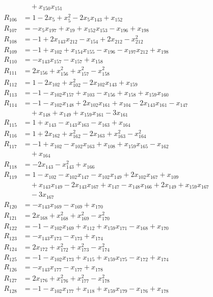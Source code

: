 \begin{align*}
&\quad{}+x_{150}x_{151}\\
R_{106}&=1-2x_{5}+x_{5}^{2}-2x_{5}x_{143}+x_{152}\\
R_{107}&=-x_{5}x_{197}+x_{19}+x_{152}x_{153}-x_{196}+x_{198}\\
R_{108}&=-1+2x_{143}x_{212}-x_{154}+2x_{212}-x_{212}^{2}\\
R_{109}&=-1+x_{102}+x_{154}x_{155}-x_{196}-x_{197}x_{212}+x_{198}\\
R_{110}&=-x_{143}x_{157}-x_{157}+x_{158}\\
R_{111}&=2x_{156}+x_{156}^{2}+x_{157}^{2}-x_{158}^{2}\\
R_{112}&=1-2x_{102}+x_{102}^{2}-2x_{102}x_{143}+x_{159}\\
R_{113}&=-1-x_{102}x_{157}+x_{103}-x_{156}+x_{158}+x_{159}x_{160}\\
R_{114}&=-1-x_{102}x_{148}+2x_{102}x_{161}+x_{104}-2x_{143}x_{161}-x_{147}\\
&\quad{}+x_{148}+x_{149}+x_{159}x_{161}-3x_{161}\\
R_{115}&=1+x_{143}-x_{143}x_{163}-x_{163}+x_{164}\\
R_{116}&=1+2x_{162}+x_{162}^{2}-2x_{163}+x_{163}^{2}-x_{164}^{2}\\
R_{117}&=-1+x_{102}-x_{102}x_{163}+x_{108}+x_{159}x_{165}-x_{162}\\
&\quad{}+x_{164}\\
R_{118}&=-2x_{143}-x_{143}^{2}+x_{166}\\
R_{119}&=1-x_{102}-x_{102}x_{147}-x_{102}x_{149}+2x_{102}x_{167}+x_{109}\\
&\quad{}+x_{143}x_{149}-2x_{143}x_{167}+x_{147}-x_{148}x_{166}+2x_{149}+x_{159}x_{167}\\
&\quad{}-3x_{167}\\
R_{120}&=-x_{143}x_{169}-x_{169}+x_{170}\\
R_{121}&=2x_{168}+x_{168}^{2}+x_{169}^{2}-x_{170}^{2}\\
R_{122}&=-1-x_{102}x_{169}+x_{112}+x_{159}x_{171}-x_{168}+x_{170}\\
R_{123}&=-x_{143}x_{173}-x_{173}+x_{174}\\
R_{124}&=2x_{172}+x_{172}^{2}+x_{173}^{2}-x_{174}^{2}\\
R_{125}&=-1-x_{102}x_{173}+x_{115}+x_{159}x_{175}-x_{172}+x_{174}\\
R_{126}&=-x_{143}x_{177}-x_{177}+x_{178}\\
R_{127}&=2x_{176}+x_{176}^{2}+x_{177}^{2}-x_{178}^{2}\\
R_{128}&=-1-x_{102}x_{177}+x_{118}+x_{159}x_{179}-x_{176}+x_{178}\\

\end{align*}
